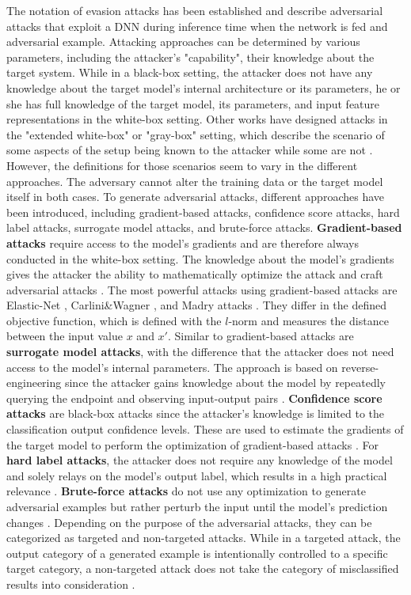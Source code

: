 The notation of evasion attacks has been established and describe adversarial attacks that exploit a DNN during inference time when the network is fed and adversarial example. 
Attacking approaches can be determined by various parameters, including the attacker's "capability", their knowledge about the target system. While in a black-box setting, the attacker does not have any knowledge about the target model's internal architecture or its parameters, he or she has full knowledge of the target model, its parameters, and input feature representations in the white-box setting. Other works have designed attacks in the "extended white-box" or "gray-box" setting, which describe the scenario of some aspects of the setup being known to the attacker while some are not \cite{vivek2018gray}. However, the definitions for those scenarios seem to vary in the different approaches.
The adversary cannot alter the training data or the target model itself in both cases.
To generate adversarial attacks, different approaches have been introduced, including gradient-based attacks, confidence score attacks, hard label attacks, surrogate model attacks, and brute-force attacks. \textbf{Gradient-based attacks} require access to the model's gradients and are therefore always conducted in the white-box setting. The knowledge about the model's gradients gives the attacker the ability to mathematically optimize the attack and craft adversarial attacks \cite{carlini2017adversarial}. The most powerful attacks using gradient-based attacks are Elastic-Net \cite{chen2017ead}, Carlini\&Wagner \cite{carlini2017adversarial}, and Madry attacks \cite{madry2017towards}. They differ in the defined objective function, which is defined with the $l$-norm and measures the distance between the input value \(x\) and \(x'\). Similar to gradient-based attacks are \textbf{surrogate model attacks}, with the difference that the attacker does not need access to the model's internal parameters. The approach is based on reverse-engineering since the attacker gains knowledge about the model by repeatedly querying the endpoint and observing input-output pairs \cite{uesato2018adversarial}. 
\textbf{Confidence score attacks} are black-box attacks since the attacker's knowledge is limited to the classification output confidence levels. These are used to estimate the gradients of the target model to perform the optimization of gradient-based attacks \cite{chen2017zoo, ilyas2018black}. For \textbf{hard label attacks}, the attacker does not require any knowledge of the model and solely relays on the model's output label, which results in a high practical relevance \cite{brendel2017decision}. \textbf{Brute-force attacks} do not use any optimization to generate adversarial examples but rather perturb the input until the model's prediction changes \cite{engstrom2019exploring, hendrycks2018benchmarking, ford2019adversarial}. 
Depending on the purpose of the adversarial attacks, they can be categorized as targeted and non-targeted attacks. While in a targeted attack, the output category of a generated example is intentionally controlled to a specific target category, a non-targeted attack does not take the category of misclassified results into consideration \cite{vijayaraghavan2019generating}.




